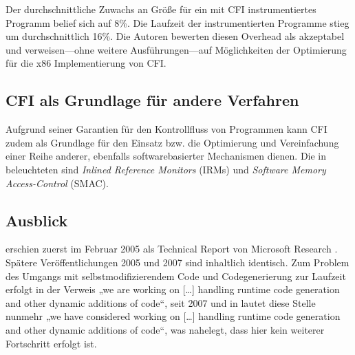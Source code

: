 \documentclass[11pt]{article}
\begin{document}
Der durchschnittliche Zuwachs an Größe für ein mit CFI instrumentiertes
Programm belief sich auf 8\%. Die Laufzeit der instrumentierten Programme stieg
um durchschnittlich 16\%. Die Autoren bewerten diesen Overhead als akzeptabel
und verweisen—ohne weitere Ausführungen—auf Möglichkeiten der Optimierung für
die x86 Implementierung von CFI.


\subsection{CFI als Grundlage für andere Verfahren}

Aufgrund seiner Garantien für den Kontrollfluss von Programmen kann CFI zudem
als Grundlage für den Einsatz bzw. die Optimierung und Vereinfachung einer
Reihe anderer, ebenfalls softwarebasierter Mechanismen dienen. Die in
\cite{abadi-2009-control-tissec} beleuchteten sind \emph{Inlined Reference
Monitors} (IRMs) und \emph{Software Memory Access-Control} (SMAC).


\subsection{Ausblick}

\cite{abadi-2009-control-tissec} erschien zuerst im Februar 2005 als Technical
Report von Microsoft Research \cite{abadi-2005-control-msr}. Spätere
Veröffentlichungen 2005 und 2007 sind inhaltlich identisch. Zum Problem des
Umgangs mit selbstmodifizierendem Code und Codegenerierung zur Laufzeit erfolgt
in \cite{abadi-2005-control-msr} der Verweis „we are working on […] handling
runtime code generation and other dynamic additions of code“, seit 2007 und in
\cite{abadi-2009-control-tissec} lautet diese Stelle nunmehr „we have
considered working on […] handling runtime code generation and other dynamic
additions of code“, was nahelegt, dass hier kein weiterer Fortschritt erfolgt
ist. %
\end{document}
